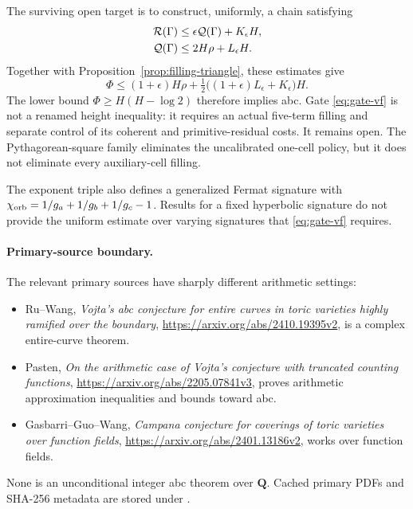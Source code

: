 The surviving open target is to construct, uniformly, a chain satisfying
\begin{align}
 \mathcal R(\Gamma)&\leq\epsilon\mathcal Q(\Gamma)+K_\epsilon H,\notag\\
 \mathcal Q(\Gamma)&\leq2H\rho+L_\epsilon H.
 \label{eq:gate-vf}
\end{align}
Together with Proposition~\ref{prop:filling-triangle}, these estimates give
\[
 \Phi\leq(1+\epsilon)H\rho
 +\tfrac12\bigl((1+\epsilon)L_\epsilon+K_\epsilon\bigr)H.
\]
The lower bound $\Phi\geq H(H-\log2)$ therefore implies abc.  Gate
\eqref{eq:gate-vf} is not a renamed height inequality: it requires an actual
five-term filling and separate control of its coherent and
primitive-residual costs.  It remains open.
The Pythagorean-square family eliminates the uncalibrated one-cell policy,
but it does not eliminate every auxiliary-cell filling.

The exponent triple also defines a generalized Fermat signature with
$\chi_{\rm orb}=1/g_a+1/g_b+1/g_c-1$.  Results for a fixed hyperbolic
signature do not provide the uniform estimate over varying signatures that
\eqref{eq:gate-vf} requires.

\paragraph{Primary-source boundary.}
The relevant primary sources have sharply different arithmetic settings:
\begin{itemize}
\item Ru--Wang, \emph{Vojta's abc conjecture for entire curves in toric
varieties highly ramified over the boundary},
\url{https://arxiv.org/abs/2410.19395v2}, is a complex entire-curve theorem.
\item Pasten, \emph{On the arithmetic case of Vojta's conjecture with
truncated counting functions},
\url{https://arxiv.org/abs/2205.07841v3}, proves arithmetic approximation
inequalities and bounds toward abc.
\item Gasbarri--Guo--Wang, \emph{Campana conjecture for coverings of toric
varieties over function fields},
\url{https://arxiv.org/abs/2401.13186v2}, works over function fields.
\end{itemize}
None is an unconditional integer abc theorem over $\mathbf Q$.  Cached
primary PDFs and SHA-256 metadata are stored under
.

